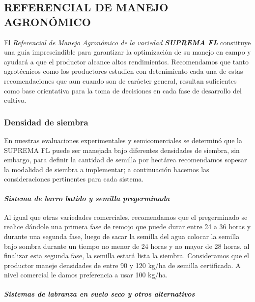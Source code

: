 \documentclass[
  letterpaper,
  DIV=11,
  numbers=noendperiod]{scrartcl}
\let\oldparagraph\paragraph
\renewcommand{\paragraph}[1]{\oldparagraph{#1}\mbox{}}
\begin{document}
\subsection{\texorpdfstring{\textbf{REFERENCIAL DE MANEJO
AGRONÓMICO}}{REFERENCIAL DE MANEJO AGRONÓMICO}}\label{referencial-de-manejo-agronuxf3mico}

El \emph{Referencial de Manejo Agronómico de la variedad \textbf{SUPREMA
FL}} constituye una guía imprescindible para garantizar la optimización
de su manejo en campo y ayudará a que el productor alcance altos
rendimientos. Recomendamos que tanto agrotécnicos como los productores
estudien con detenimiento cada una de estas recomendaciones que aun
cuando son de carácter general, resultan suficientes como base
orientativa para la toma de decisiones en cada fase de desarrollo del
cultivo.

\subsubsection{\texorpdfstring{\textbf{Densidad de
siembra}}{Densidad de siembra}}\label{densidad-de-siembra}

En nuestras evaluaciones experimentales y semicomerciales se determinó
que la SUPREMA FL puede ser manejada bajo diferentes densidades de
siembra, sin embargo, para definir la cantidad de semilla por hectárea
recomendamos sopesar la modalidad de siembra a implementar; a
continuación hacemos las consideraciones pertinentes para cada sistema.

\paragraph{\texorpdfstring{\textbf{\emph{Sistema de barro batido y
semilla
pregerminada}}}{Sistema de barro batido y semilla pregerminada}}\label{sistema-de-barro-batido-y-semilla-pregerminada}

Al igual que otras variedades comerciales, recomendamos que el
pregerminado se realice dándole una primera fase de remojo que puede
durar entre 24 a 36 horas y durante una segunda fase, luego de sacar la
semilla del agua colocar la semilla bajo sombra durante un tiempo no
menor de 24 horas y no mayor de 28 horas, al finalizar esta segunda
fase, la semilla estará lista la siembra. Consideramos que el productor
maneje densidades de entre 90 y 120 kg/ha de semilla certificada. A
nivel comercial le damos preferencia a usar 100 kg/ha.

\paragraph{\texorpdfstring{\textbf{\emph{Sistemas de labranza en suelo
seco y otros
alternativos}}}{Sistemas de labranza en suelo seco y otros alternativos}}\label{sistemas-de-labranza-en-suelo-seco-y-otros-alternativos}
\end{document}
